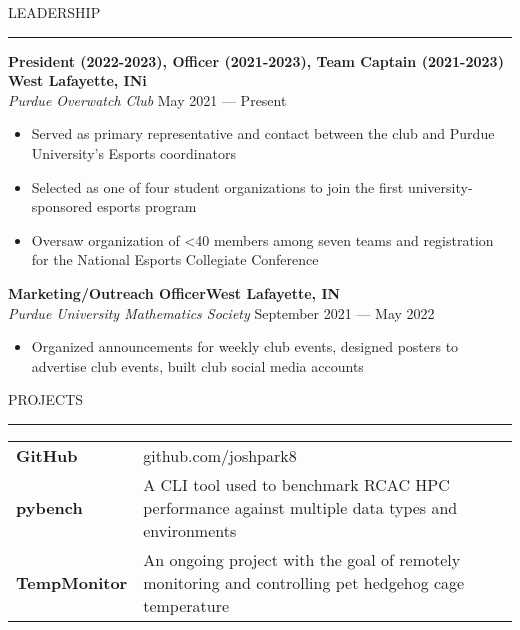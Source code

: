\documentclass[letter,11pt]{article}
\begin{document}
LEADERSHIP

\vspace*{-1.25em}
\rule{\textwidth}{1.2pt}
\textbf{President (2022-2023), Officer (2021-2023), Team Captain (2021-2023) \hfill West Lafayette, INi}\\
\emph{Purdue Overwatch Club} \hfill May 2021 --- Present\\
\vspace*{-1.75em}
\begin{itemize}[label=-, leftmargin=*, align=left, noitemsep]
    \item Served as primary representative and contact between the club and Purdue University's Esports coordinators
    \item Selected as one of four student organizations to join the first university-sponsored esports program
    \item Oversaw organization of <40 members among seven teams and registration for the National Esports Collegiate Conference
\end{itemize}
\vspace*{-0.25em}

\textbf{Marketing/Outreach Officer\hfill West Lafayette, IN} \\
\emph{Purdue University Mathematics Society} \hfill September 2021 --- May 2022\\
\vspace*{-1.75em}
\begin{itemize}[label=-, leftmargin=*, labelwidth=1.5cm, align=left, noitemsep]
    \item Organized announcements for weekly club events, designed posters to advertise club events, built club social media accounts
\end{itemize}

PROJECTS

\vspace*{-1.25em}
\rule{\textwidth}{1.2pt}

\begin{tabular}{@{}p{2.25cm}l}
    \textbf{GitHub} &github.com/joshpark8 \\
    \textbf{pybench} &A CLI tool used to benchmark RCAC HPC performance against multiple data types and environments \\
    \textbf{TempMonitor} &An ongoing project with the goal of remotely monitoring and controlling pet hedgehog cage temperature
\end{tabular}
\end{document}
